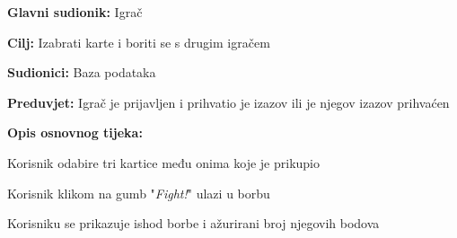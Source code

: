 					\noindent {}
					\begin{packed_item}
	
						\item \textbf{Glavni sudionik: }Igrač
						\item  \textbf{Cilj:} Izabrati karte i boriti se s drugim igračem
						\item  \textbf{Sudionici:} Baza podataka
						\item  \textbf{Preduvjet:} Igrač je prijavljen i prihvatio je izazov ili je njegov izazov prihvaćen
						\item  \textbf{Opis osnovnog tijeka:}
						
						\item[] \begin{packed_enum}
	
							\item Korisnik odabire tri kartice među onima koje je prikupio
							\item Korisnik klikom na gumb "\textit{Fight!}" ulazi u borbu
							\item Korisniku se prikazuje ishod borbe i ažurirani broj njegovih bodova
						\end{packed_enum}
						
					\end{packed_item}
					
